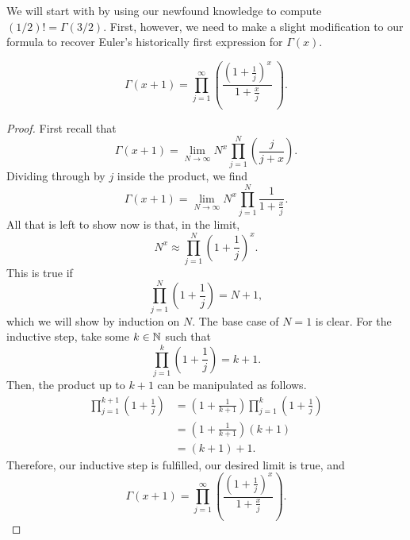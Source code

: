We will start with by using our newfound knowledge to compute $(1/2)! = \Gamma(3/2)$.
First, however, we need to make a slight modification to our formula to recover Euler's historically first expression for $\Gamma(x)$.

\begin{prop}
\begin{equation}\label{historicProductForm}
\Gamma(x+1) = \prod_{j=1}^\infty \left( \frac{\left(1 + \frac{1}{j}\right)^x}{1 + \frac{x}{j}}\ \right).
\end{equation}
\end{prop}

\begin{proof}
First recall that
$$\Gamma(x+1) = \lim_{N \rightarrow \infty} N^x \prod_{j=1}^N \left( \frac{j}{j+x} \right).$$
Dividing through by $j$ inside the product, we find
$$\Gamma(x+1) = \lim_{N \rightarrow \infty} N^x \prod_{j=1}^N \frac{1}{1 + \frac{x}{j}}.$$
All that is left to show now is that, in the limit,
$$N^x \approx \prod_{j=1}^N \left(1 + \frac{1}{j}\right)^x.$$
This is true if
$$\prod_{j=1}^N \left(1 + \frac{1}{j}\right) = N+1,$$
which we will show by induction on $N$.
The base case of $N=1$ is clear.
For the inductive step, take some $k \in \mathbb{N}$ such that 
$$\prod_{j=1}^k \left(1 + \frac{1}{j}\right) = k+1.$$
Then, the product up to $k+1$ can be manipulated as follows.
\begin{align*}
\prod_{j=1}^{k+1} \left(1 + \frac{1}{j}\right) &= \left(1+\frac{1}{k+1}\right)\prod_{j=1}^{k} \left(1 + \frac{1}{j}\right) \\
&= \left(1+\frac{1}{k+1}\right) (k+1) \\
&= (k+1) + 1.
\end{align*}
Therefore, our inductive step is fulfilled, our desired limit is true, and
$$\Gamma(x+1) = \prod_{j=1}^\infty \left( \frac{\left(1 + \frac{1}{j}\right)^{x}}{1 + \frac{x}{j}} \right).$$
\end{proof}

